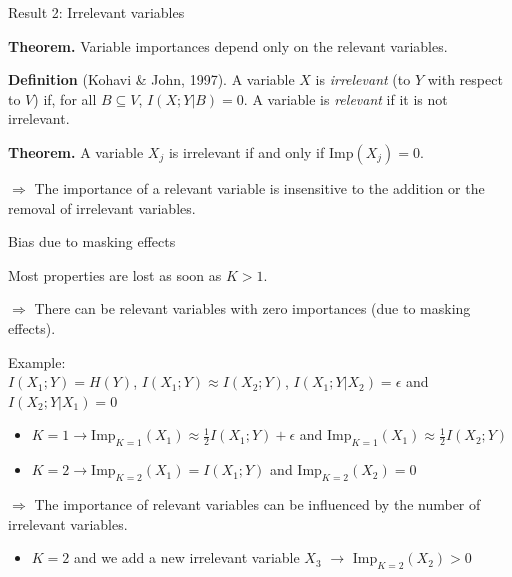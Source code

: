 \documentclass{beamer}
\begin{document}
\begin{frame}{Result 2: Irrelevant variables}

{\bf Theorem.} Variable importances depend only on the relevant variables.

\vspace{1cm}

\textbf{Definition} {\scriptsize (Kohavi \& John, 1997)}. A variable $X$ is
{\it irrelevant} (to $Y$ with respect to $V$) if, for all $B\subseteq V$,
$I(X;Y|B)=0$. A variable is {\it relevant} if it is not irrelevant.

\vspace{1cm}

{\bf Theorem.} A variable $X_j$ is irrelevant if and only if $\text{Imp}(X_j)= 0$.

\vspace{1cm}

{\color{blue} $\Rightarrow$ The importance of a relevant variable is
insensitive  to the addition or the removal of irrelevant variables.}

\end{frame}

\begin{frame}{Bias due to masking effects}

Most properties are lost as soon as $K>1$.

\bigskip

{\color{blue}$\Rightarrow$ There can be relevant variables with zero
importances (due to masking effects).}

\medskip

{\footnotesize
Example:\\
$I(X_1;Y)=H(Y)$, $I(X_1;Y) \approx I(X_2;Y)$, $I(X_1;Y|X_2)=\epsilon$ and $I(X_2;Y|X_1)=0$
\begin{itemize}
\item $K=1 \rightarrow \text{Imp}_{K=1}(X_1) \approx \frac{1}{2} I(X_1;Y)+\epsilon$ and $\text{Imp}_{K=1}(X_1)\approx \frac{1}{2} I(X_2;Y)$
\item $K=2 \rightarrow \text{Imp}_{K=2}(X_1)=I(X_1;Y)$ and $\text{Imp}_{K=2}(X_2)=0$
\end{itemize}}

\bigskip

{\color{blue}$\Rightarrow$ The importance of relevant variables can be
influenced by the number of irrelevant variables.}

\medskip

{\footnotesize
\begin{itemize}
\item $K=2$ and we add a new irrelevant variable $X_3$ $\rightarrow$ $\text{Imp}_{K=2}(X_2)>0$
\end{itemize}}

\end{frame}
\end{document}
